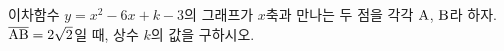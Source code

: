 이차함수 $y=x^2-6x+k-3$의 그래프가 $x$축과 만나는 두 점을 각각 $\mathrm{A}$, $\mathrm{B}$라 하자. $\overline{\mathrm{AB}}=2\sqrt{2}$일 때, 상수 $k$의 값을 구하시오.
